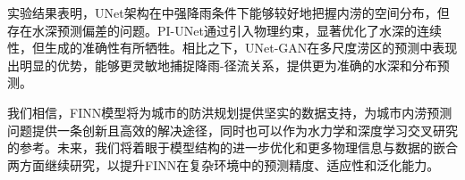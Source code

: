 \documentclass[12pt, a4paper]{article}
\begin{document}
实验结果表明，UNet架构在中强降雨条件下能够较好地把握内涝的空间分布，但存在水深预测偏差的问题。PI-UNet通过引入物理约束，显著优化了水深的连续性，但生成的准确性有所牺牲。相比之下，UNet-GAN在多尺度涝区的预测中表现出明显的优势，能够更灵敏地捕捉降雨-径流关系，提供更为准确的水深和分布预测。

我们相信，FINN模型将为城市的防洪规划提供坚实的数据支持，为城市内涝预测问题提供一条创新且高效的解决途径，同时也可以作为水力学和深度学习交叉研究的参考。未来，我们将着眼于模型结构的进一步优化和更多物理信息与数据的嵌合两方面继续研究，以提升FINN在复杂环境中的预测精度、适应性和泛化能力。



\end{document}
